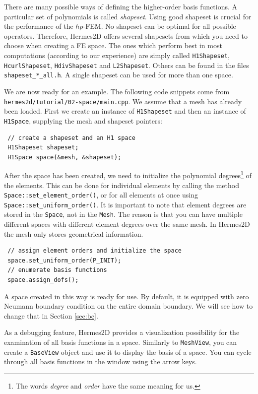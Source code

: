 \documentclass[11pt]{article}
\begin{document}
There are many possible ways of defining the
higher-order basis functions. A particular set of polynomials is called
\emph{shapeset}. Using good shapeset is crucial for the
performance of the $hp$-FEM. No shapeset can be optimal for all possible operators.
Therefore, Hermes2D offers several shapesets from which
you need to choose when creating a FE space. The ones which perform best
in most computations (according to our experience) are simply called
{\tt H1Shapeset}, {\tt HcurlShapeset}, {\tt HdivShapeset} and {\tt L2Shapeset}.
Others can be found in the files {\tt shapeset\_*\_all.h}. A single shapeset
can be used for more than one space.

We are now ready for an example. The following code snippets come from
\verb"hermes2d/tutorial/02-space/main.cpp". We assume that a mesh has already
been loaded. First we create an instance of {\tt H1Shapeset} and then an
instance of {\tt H1Space}, supplying the mesh and shapeset pointers:

\begin{lstlisting}
 // create a shapeset and an H1 space
 H1Shapeset shapeset;
 H1Space space(&mesh, &shapeset);
\end{lstlisting}

After the space has been created, we need to initialize the polynomial
degrees\footnote{The words \emph{degree} and \emph{order} have the same meaning for us.}
of the elements. This can be done for individual elements by calling the method
\verb"Space::set_element_order()", or for all elements at once using
\verb"Space::set_uniform_order()". It is important to note that element degrees
are stored in the {\tt Space}, not in the {\tt Mesh}. The reason is that you can
have multiple different spaces with different element degrees over the same mesh.
In Hermes2D the mesh only stores geometrical information.

\begin{lstlisting}
 // assign element orders and initialize the space
 space.set_uniform_order(P_INIT);
 // enumerate basis functions
 space.assign_dofs();
\end{lstlisting}

A space created in this way is ready for use. By default, it is equipped with
zero Neumann boundary condition on the entire domain boundary. We will see
how to change that in Section \ref{sec:bc}.

As a debugging feature, Hermes2D provides a visualization possibility for the
examination of all basis functions in a space. Similarly to {\tt MeshView},
you can create a {\tt BaseView} object and use it to display the basis of a space.
You can cycle through all basis functions in the window using the arrow keys.
\end{document}

